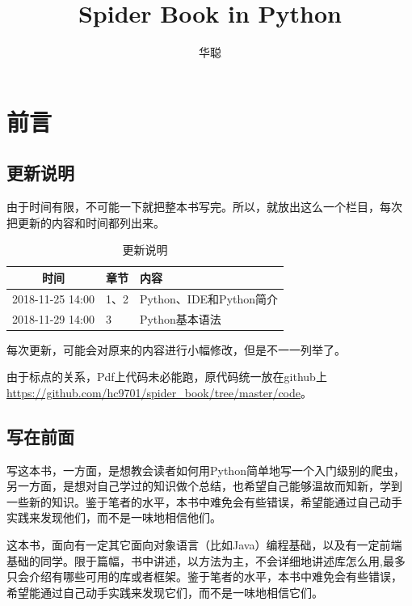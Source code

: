 \documentclass[11pt,UTF8,oneside]{mybook}
\begin{document}
\setlength{\parindent}{2em} \title{Spider Book in Python} \author{华聪}
\date{} \setlength{\parskip}{5pt} \setlength{\baselineskip}{1.5em}

\maketitle
\frontmatter



\chapter{前言}


\section{更新说明}

由于时间有限，不可能一下就把整本书写完。所以，就放出这么一个栏目，每次
把更新的内容和时间都列出来。

\begin{table}[htb]
  \centering
  \caption{更新说明}
  \begin{tabular}{clp{10cm}}
    \toprule
    时间&章节&内容\\
    \midrule
    2018-11-25 14:00&1、2&Python、IDE和Python简介\\
    2018-11-29 14:00&3&Python基本语法\\
    \bottomrule
  \end{tabular}
  
  \label{tab:update_instruction}
\end{table}
每次更新，可能会对原来的内容进行小幅修改，但是不一一列举了。

由于标点的关系，Pdf上代码未必能跑，原代码统一放在github上\url{https://github.com/hc9701/spider_book/tree/master/code}。

\section{写在前面}

写这本书，一方面，是想教会读者如何用Python简单地写一个入门级别的爬虫，
另一方面，是想对自己学过的知识做个总结，也希望自己能够温故而知新，学到
一些新的知识。鉴于笔者的水平，本书中难免会有些错误，希望能通过自己动手
实践来发现他们，而不是一味地相信他们。

这本书，面向有一定其它面向对象语言（比如Java）编程基础，以及有一定前端
基础的同学。限于篇幅，书中讲述，以方法为主，不会详细地讲述库怎么用,最多
只会介绍有哪些可用的库或者框架。鉴于笔者的水平，本书中难免会有些错误，
希望能通过自己动手实践来发现它们，而不是一味地相信它们。
\end{document}
